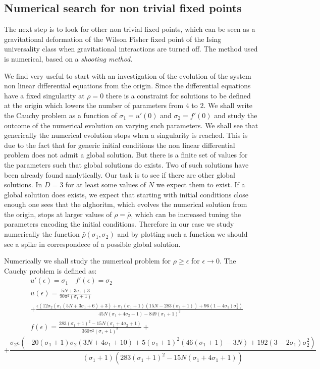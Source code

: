 \subsection{Numerical search for non trivial fixed points}
The next step is to look for other non trivial fixed points, which can  be seen as a gravitational deformation of the Wilson Fisher fixed point of the Ising universality class when gravitational interactions are turned off. 
The method used is numerical, based on a \emph{shooting method}. 

We find very useful to start with an investigation of the evolution of the system non linear differential equations from the origin.
Since the differential equations have a fixed singularity at $\rho=0$ there is a constraint for solutions to be defined at the origin which lowers the number of parameters from $4$ to $2$.
We shall write the Cauchy problem as a function of $\sigma_1=u'(0)$ and $\sigma_2=f'(0)$ and study the outcome of the numerical evolution on varying such parameters.
We shall see that generically the numerical evolution stops when a singularity is reached. This is due to the fact that for generic initial conditions the non linear differential problem does not admit a global solution.
But there is a finite set of values for the parameters such that global solutions do exists. Two of such solutions have been already found analytically.
Our task is to see if there are other global solutions. In $D=3$ for at least some values of $N$ we expect them to exist.
If a global solution does exists, we expect that starting with initial conditions close enough one sees that the alghoritm, which evolves the numerical solution from the origin, stops at larger values of $\rho=\bar\rho$, 
which can be increased tuning the parameters encoding the initial conditions.
Therefore in our case we study numerically the function $\bar\rho(\sigma_1,\sigma_2)$ and by plotting such a function we should see a spike in correspondece of a possible global solution.

Numerically we shall study the numerical problem for $\rho\ge\epsilon$ for $\epsilon \to 0$.
The Cauchy problem is defined as:
\small{
\begin{eqnarray}
&{}& u'(\epsilon)=\sigma_1 \quad f'(\epsilon)=\sigma_2 \nonumber\\
&{}&u(\epsilon)=\frac{5 N+3 \sigma_1+3}{90 \pi ^2 (\sigma_1+1)}\nonumber\\
&{}&+\frac{\epsilon  \left(12 \sigma_2 (\sigma_1 (5 N+3 \sigma_1+6)+3)+\sigma_1 (\sigma_1+1) (15 N-283 (\sigma_1+1))
+96 (1-4 \sigma_1) \sigma_2^2\right)}{45 N (\sigma_1+4 \sigma_2+1)-849 (\sigma_1+1)^2}
\nonumber\\
&{}&f(\epsilon)=
\frac{283 (\sigma_1+1)^2-15 N (\sigma_1+4 \sigma_2+1)}{360 \pi ^2 (\sigma_1+1)^2}+
\end{eqnarray}
\begin{equation}
 +\frac{\sigma_2 \epsilon  \left(-20 (\sigma_1+1) \sigma_2 (3 N+4 \sigma_1+10)+5 (\sigma_1+1)^2 (46 (\sigma_1+1)-3 N)+192 (3-2 \sigma_1) \sigma_2^2\right)}{(\sigma_1+1) \left(283 (\sigma_1+1)^2-15 N (\sigma_1+4 \sigma_1+1)\right)} 
\end{equation}
}
   
